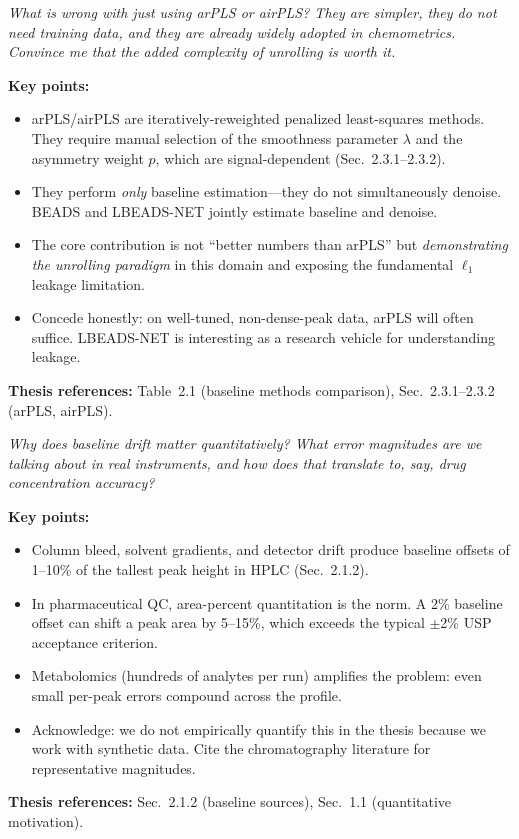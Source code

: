 \documentclass[11pt, letterpaper]{article}
\newcounter{qcounter}
\newcommand{\question}[1]{%
  \stepcounter{qcounter}%
  \begin{questionbox}[Q\theqcounter]%
    \itshape #1%
  \end{questionbox}%
}
\begin{document}
\question{What is wrong with just using arPLS or airPLS?  They are simpler,
they do not need training data, and they are already widely adopted
in chemometrics.  Convince me that the added complexity of unrolling
is worth it.}

\begin{answerbox}
\textbf{Key points:}
\begin{itemize}[nosep]
  \item arPLS/airPLS are iteratively-reweighted penalized least-squares
        methods.  They require manual selection of the smoothness
        parameter $\lambda$ and the asymmetry weight $p$, which are
        signal-dependent (Sec.~2.3.1--2.3.2).
  \item They perform \emph{only} baseline estimation---they do not
        simultaneously denoise.  BEADS and LBEADS-NET jointly estimate
        baseline and denoise.
  \item The core contribution is not ``better numbers than arPLS'' but
        \emph{demonstrating the unrolling paradigm} in this domain and
        exposing the fundamental $\ell_1$ leakage limitation.
  \item Concede honestly: on well-tuned, non-dense-peak data, arPLS
        will often suffice.  LBEADS-NET is interesting as a research
        vehicle for understanding leakage.
\end{itemize}
\textbf{Thesis references:} Table~2.1 (baseline methods comparison), Sec.~2.3.1--2.3.2 (arPLS, airPLS).
\end{answerbox}

\question{Why does baseline drift matter quantitatively?  What error
magnitudes are we talking about in real instruments, and how does
that translate to, say, drug concentration accuracy?}

\begin{answerbox}
\textbf{Key points:}
\begin{itemize}[nosep]
  \item Column bleed, solvent gradients, and detector drift produce
        baseline offsets of 1--10\% of the tallest peak height in HPLC
        (Sec.~2.1.2).
  \item In pharmaceutical QC, area-percent quantitation is the norm.
        A 2\% baseline offset can shift a peak area by 5--15\%, which
        exceeds the typical $\pm$2\% USP acceptance criterion.
  \item Metabolomics (hundreds of analytes per run) amplifies the
        problem: even small per-peak errors compound across the profile.
  \item Acknowledge: we do not empirically quantify this in the thesis
        because we work with synthetic data.  Cite the chromatography
        literature for representative magnitudes.
\end{itemize}
\textbf{Thesis references:} Sec.~2.1.2 (baseline sources), Sec.~1.1 (quantitative motivation).
\end{answerbox}
\end{document}
